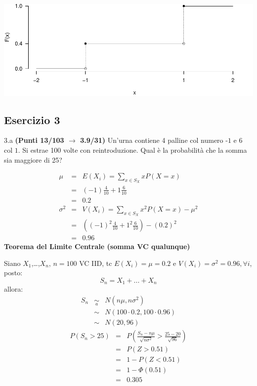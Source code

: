 \documentclass[
  11pt,
]{book}
\theoremstyle{mytheoremstyle}
\theoremstyle{mydefstyle}
\newenvironment{sol}
  {
  \begin{tcolorbox}[enhanced,breakable,arc=0.1mm,boxrule=1pt,colback=white,colframe=iblue,
  title=\bf \fontfamily{lmss}\selectfont \hspace{.5 cm} Soluzione,drop fuzzy shadow]

}{
\end{tcolorbox}
  }
\begin{document}
\begin{sol}

\begin{center}\includegraphics{Esami_passati_con_soluzioni_files/figure-latex/2024-108-1} \end{center}

\end{sol}

\subsection{Esercizio 3}\label{esercizio-3-39}

3.a \textbf{(Punti 13/103 \(\rightarrow\) 3.9/31)} Un'urna contiene 4 palline col numero \(\mbox{-1}\) e 6 col \(\mbox{1}\).
Si estrae 100 volte con reintroduzione.
Qual è la probabilità che la somma sia maggiore di 25?

\begin{sol}
\begin{eqnarray*} \mu &=& E(X_i) = \sum_{x\in S_X}x P(X=x)\\ 
 &=& ( -1 ) \frac { 4 }{ 10 }+ 1  \frac { 6 }{ 10 } \\ 
            &=& 0.2 \\ 
 \sigma^2 &=& V(X_i) = \sum_{x\in S_X}x^2 P(X=x)-\mu^2\\ 
 &=&\left( ( -1 ) ^2\frac { 4 }{ 10 }+ 1  ^2\frac { 6 }{ 10 } \right)-( 0.2 )^2\\ 
            &=& 0.96 
\end{eqnarray*}
\textbf{Teorema del Limite Centrale (somma VC qualunque)}

Siano \(X_1\),\ldots,\(X_n\), \(n=100\) VC IID, tc \(E(X_i)=\mu=0.2\) e \(V(X_i)=\sigma^2=0.96,\forall i\), posto:
\[
      S_n = X_1 + ... + X_n
      \]
allora:\begin{eqnarray*}
  S_n & \mathop{\sim}\limits_{a}& N(n\mu,n\sigma^2) \\
     &\sim & N(100\cdot0.2,100\cdot0.96) \\
     &\sim & N(20,96) 
  \end{eqnarray*}\begin{eqnarray*}
      P( S_n   >   25 ) 
        &=& P\left(  \frac { S_n  -  n\mu }{ \sqrt{n\sigma^2} }  >  \frac { 25  -  20 }{\sqrt{ 96 }} \right)  \\
                 &=& P\left(  Z   >   0.51 \right) \\    &=& 1-P(Z< 0.51 )\\ 
                 &=&  1-\Phi( 0.51 ) \\ &=&  0.305 
      \end{eqnarray*}

\end{sol}
\end{document}
